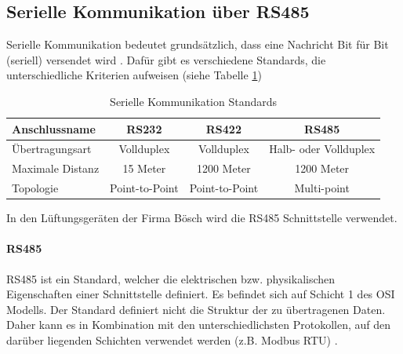 \subsection{Serielle Kommunikation über RS485}
Serielle Kommunikation bedeutet grundsätzlich, dass eine Nachricht Bit für Bit (seriell) versendet wird \cite{Schnabel:o.J.}. Dafür gibt es verschiedene Standards, die unterschiedliche Kriterien aufweisen (siehe Tabelle \ref{tab:serielle}) 
\begin{table}[H]
	\caption{Serielle Kommunikation Standards \label{tab:serielle}}
	\begin{tabularx}{\textwidth}{@{}X|c|c|c@{}}
		\toprule
		\textbf{Anschlussname} & \textbf{RS232} & \textbf{RS422} & \textbf{RS485}\\
		\midrule
		Übertragungsart & Vollduplex & Vollduplex & Halb- oder Vollduplex \\
		Maximale Distanz & 15 Meter & 1200 Meter & 1200 Meter \\
		Topologie & Point-to-Point & Point-to-Point & Multi-point \\
		\bottomrule
	\end{tabularx}
\end{table}
\cite{IPC2U_GmbH_SerielleSchnittstellen:o.J.}

In den Lüftungsgeräten der Firma Bösch wird die RS485 Schnittstelle verwendet.

\paragraph{RS485} \label{rs485}
RS485 ist ein Standard, welcher die elektrischen bzw. physikalischen Eigenschaften einer Schnittstelle definiert. Es befindet sich auf Schicht 1 des OSI Modells. Der Standard definiert nicht die Struktur der zu übertragenen Daten. Daher kann es in Kombination mit den unterschiedlichsten Protokollen, auf den darüber liegenden Schichten verwendet werden (z.B. Modbus RTU) \cite{Janitza:o.J.}.

